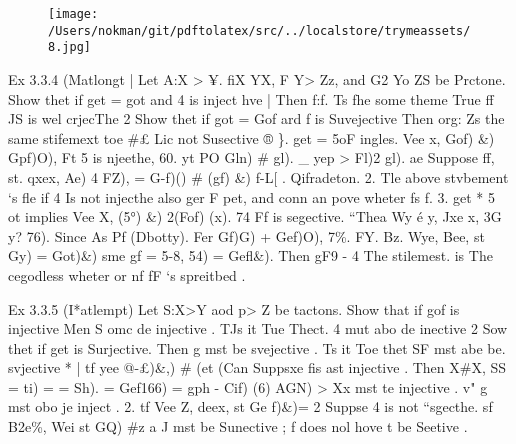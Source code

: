 \documentclass[a4paper,12pt]{article}
\begin{document}
\vspace{10pt}

\par

\vspace{10pt}

\begin{figure}[h]

\texttt{[image: /Users/nokman/git/pdftolatex/src/../localstore/trymeassets/8.jpg]}

\centering

\end{figure}

\par

\vspace{10pt}

    Ex 3.3.4 (Matlongt |   Let A:X > ¥. fiX YX, F Y> Zz, and G2 Yo ZS be Prctone.  Show thet if get = got and 4 is inject hve | Then f:f.   Ts fhe some theme True ff JS is wel crjecThe 2   Show thet if got = Gof ard f is Suvejective Then org:   Zs the same stifemext toe \#£ Lic not Susective ®    \}. get = 5oF ingles. Vee x, Gof) \&) Gpf)O),  Ft 5 is njeethe, 60. yt PO Gln) \# gl).    \_ yep > Fl)2 gl). ae  Suppose ff, st. qxex, Ae) 4 FZ), = G-f)() \# (gf) \&)  f-L[ . Qifradeton.    2. Tle above stvbement ‘s fle if 4 Is not injecthe also ger F pet, and conn an  pove wheter fs f.    3. get * 5 ot implies Vee X, (5°) \&) 2(Fof) (x).  74 Ff is segective. “Thea Wy é y, Jxe x, 3G y? 76).  Since As Pf (Dbotty). Fer Gf)G) + Gef)O), 7\%. FY. Bz.    Wye, Bee, st Gy) = Got)\&) sme gf = 5-8,  54) = Gefl\&). Then gF9 -    4 The stilemest. is The cegodless wheter or nf fF ‘s spreitbed . 

\vspace{10pt}

\par

\vspace{10pt}

    Ex 3.3.5 (I*atlempt)  Let S:X>Y aod p> Z be tactons.  Show that if gof is injective Men S omc de injective .    TJs it Tue Thect. 4 mut abo de inective 2  Sow thet if get is Surjective. Then g mst be svejective .  Ts it Toe thet SF mst abe be. svjective *    | tf yee @-£)\&,) \# (et (Can  Suppsxe fis ast injective . Then X\#X, SS = ti) = = Sh).  = Gef166) = gph  - Cif) (6) AGN)  > Xx mst te injective . v"  g mst obo je inject .    2. tf Vee Z, deex, st Ge f)\&)= 2  Suppse 4 is not “sgecthe. sf B2e\%, Wei st GQ) \#z a    J mst be Sunective ;  f does nol hove t be Seetive . 
\end{document}
